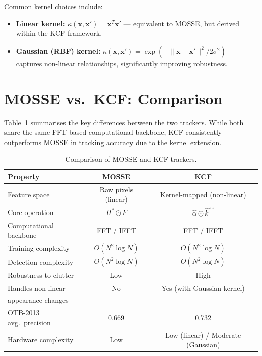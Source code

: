 \documentclass[a4paper,12pt]{report}
\begin{document}
Common kernel choices include:
\begin{itemize}
    \item \textbf{Linear kernel:} $\kappa(\mathbf{x}, \mathbf{x}') = \mathbf{x}^T \mathbf{x}'$ --- equivalent to MOSSE, but derived within the KCF framework.
    \item \textbf{Gaussian (RBF) kernel:} $\kappa(\mathbf{x}, \mathbf{x}') = \exp\!\left(-\|\mathbf{x} - \mathbf{x}'\|^2 / 2\sigma^2\right)$ --- captures non-linear relationships, significantly improving robustness.
\end{itemize}

\section{MOSSE vs.\ KCF: Comparison}

Table~\ref{tab_comparison} summarises the key differences between the two trackers. While both share the same FFT-based computational backbone, KCF consistently outperforms MOSSE in tracking accuracy due to the kernel extension.

\begin{table}[H]
\centering
\caption{Comparison of MOSSE and KCF trackers.}
\label{tab_comparison}
\begin{tabular}{|l|c|c|}
\hline
\textbf{Property} & \textbf{MOSSE} & \textbf{KCF} \\
\hline
Feature space           & Raw pixels (linear)       & Kernel-mapped (non-linear) \\
\hline
Core operation          & $H^* \odot F$             & $\hat{\alpha} \odot \hat{k}^{xz}$ \\
\hline
Computational backbone  & FFT / IFFT                & FFT / IFFT \\
\hline
Training complexity     & $O(N^2 \log N)$           & $O(N^2 \log N)$ \\
\hline
Detection complexity    & $O(N^2 \log N)$           & $O(N^2 \log N)$ \\
\hline
Robustness to clutter   & Low                       & High \\
\hline
Handles non-linear      & No                        & Yes (with Gaussian kernel) \\
appearance changes      &                           & \\
\hline
OTB-2013 avg.\ precision\cite{henriques2015} & 0.669 & 0.732 \\
\hline
Hardware complexity     & Low                       & Low (linear) / Moderate (Gaussian) \\
\hline
\end{tabular}
\end{table}
\end{document}
